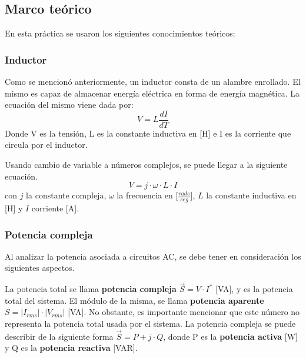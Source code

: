 \documentclass{article}
\begin{document}
        \subsection{Marco teórico}

        En esta práctica se usaron los siguientes conocimientos teóricos:

        \subsubsection{Inductor}

        Como se mencionó anteriormente, un inductor consta de un alambre enrollado. El mismo es capaz de almacenar energía eléctrica en forma de energía magnética.
         La ecuación del mismo viene dada por:
        \begin{equation*}
            V=L \frac{dI}{dT}
        \end{equation*}
        Donde V es la tensión, L es la constante inductiva en [H] e I es la corriente que circula por el inductor.

        Usando cambio de variable a números complejos, se puede llegar a la siguiente ecuación.
        \begin{equation}
            V=j\cdot \omega\cdot L \cdot I
            \label{induct}
        \end{equation}
        con $j$ la constante compleja, $\omega$ la frecuencia en [$\frac{rads}{seg}$], $L$ la constante inductiva en [H] y $I$ corriente [A].\par

        \subsubsection{Potencia compleja}

        Al analizar la potencia asociada a circuitos AC, se debe tener en consideración los siguientes aspectos.\par
        La potencia total se llama { \bfseries potencia compleja} $\vec{S}= V \cdot I^{*}$ [VA], y es la potencia total del sistema. El módulo de la misma, se llama {\bfseries potencia aparente} $S=|I_{rms}| \cdot |V_{rms}|$ [VA]. No obstante, es importante mencionar que este número no representa la potencia total usada por el sistema.
        La potencia compleja se puede describir de la siguiente forma $\vec{S}=P + j \cdot Q$, donde P es la { \bfseries potencia activa}  [W] y Q es la {\bfseries potencia reactiva} [VAR]. \par
\end{document}
